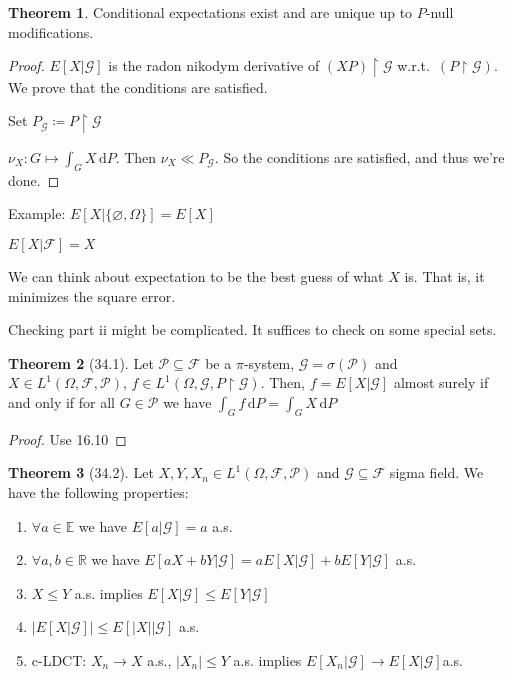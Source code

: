 \documentclass{article}
\theoremstyle{definition}
\newtheorem{theorem}{Theorem}
\begin{document}
\begin{theorem}
    Conditional expectations exist and are unique up to \(P\)-null modifications.
\end{theorem}

\begin{proof}
    \(E[X|\mathscr{G}]\) is the radon nikodym derivative of \((XP)\upharpoonright \mathscr{G}\) w.r.t.\ \((P\upharpoonright \mathscr{G})\). We prove that the conditions are satisfied.

    Set \(P_{\mathscr{G}} \coloneqq P\upharpoonright \mathscr{G}\) 

    \(\nu _X : G \mapsto \int_{G}^{} X \,\mathrm{d}P \). Then \(\nu _X \ll P_{\mathscr{G}} \). So the conditions are satisfied, and thus we're done.

\end{proof}

Example: \(E[X|\{ \varnothing ,\Omega \} ]=E[X]\) 

\(E[X|\mathscr{F}] = X\) 

We can think about expectation to be the best guess of what \(X\) is. That is, it minimizes the square error.

Checking part ii might be complicated. It suffices to check on some special sets.

\begin{theorem}
    [34.1] Let \(\mathscr{P} \subseteq \mathscr{F}\) be a \(\pi\)-system, \(\mathscr{G} = \sigma (\mathscr{P})\) and \(X\in L^1(\Omega , \mathscr{F} ,\mathscr{P})\), \(f\in L^1(\Omega , \mathscr{G} ,P\upharpoonright \mathscr{G})\). Then, \(f=E[X|\mathscr{G}]\) almost surely if and only if for all \(G\in \mathscr{P}\) we have \(\int_{G}^{} f \,\mathrm{d}P = \int_{G}^{} X \,\mathrm{d}P \) 
\end{theorem}

\begin{proof}
    Use 16.10
\end{proof}

\begin{theorem}
    [34.2] Let \(X,Y,X_n\in L^1(\Omega,\mathscr{F} ,\mathscr{P})\) and \(\mathscr{G} \subseteq \mathscr{F}\) sigma field. We have the following properties:

    \begin{enumerate}
        \item \(\forall a\in\mathbb{E} \) we have \(E[a|\mathscr{G}] = a\) a.s.
        \item \(\forall a,b\in\mathbb{R}\) we have \(E[aX+bY|\mathscr{G}] = aE[X|\mathscr{G}]+bE[Y|\mathscr{G}]\) a.s.
        \item \(X \leq Y\) a.s. implies \(E[X|\mathscr{G}] \leq E[Y|\mathscr{G}]\)
        \item \(\vert E[X|\mathscr{G}] \vert \leq E[\vert X \vert | \mathscr{G}]\) a.s.
        \item c-LDCT: \(X_n \to X\) a.s., \(\vert X_n \vert \leq Y\) a.s. implies \(E[X_n|\mathscr{G}]\to E[X|\mathscr{G}]\)a.s. 
    \end{enumerate}

\end{theorem}
\end{document}
